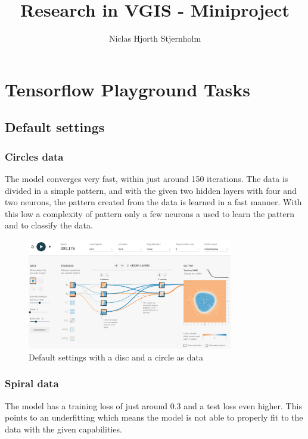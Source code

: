\documentclass{article}
\begin{document}
\title{Research in VGIS - Miniproject}
\author{Niclas Hjorth Stjernholm}

\maketitle

\section{Tensorflow Playground Tasks}
\subsection{Default settings}
\subsubsection*{Circles data}
The model converges very fast, within just around 150 iterations.
The data is divided in a simple pattern, and with the given two hidden layers with four and two neurons, the pattern created from the data is learned in a fast manner. With this low a complexity of pattern only a few neurons a used to learn the pattern and to classify the data.

\begin{figure}[h]
  \centering
  \includegraphics[width=0.8\textwidth]{default.png}
  \caption{Default settings with a disc and a circle as data}
  \label{fig:default}
\end{figure}

\subsubsection*{Spiral data}
The model has a training loss of just around $0.3$ and a test loss even higher. This points to an underfitting which means the model is not able to properly fit to the data with the given capabilities.
\end{document}
